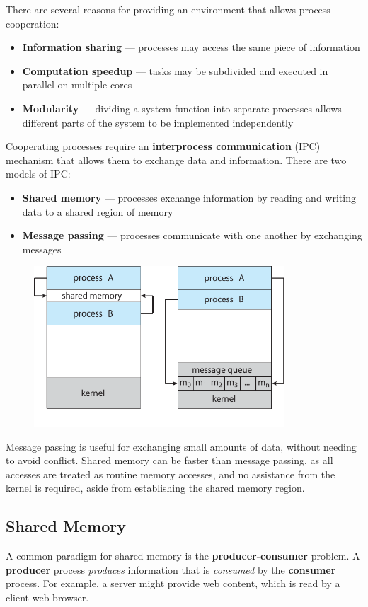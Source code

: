 \documentclass{article}
\begin{document}
There are several reasons for providing an environment that allows
process cooperation:
\begin{itemize}
    \item \textbf{Information sharing} --- processes may access the same
          piece of information
    \item \textbf{Computation speedup} --- tasks may be subdivided and
          executed in parallel on multiple cores
    \item \textbf{Modularity} --- dividing a system function into
          separate processes allows different parts of the system to be
          implemented independently
\end{itemize}
Cooperating processes require an \textbf{interprocess communication}
(IPC) mechanism that allows them to exchange data and information.
There are two models of IPC:
\begin{itemize}
    \item \textbf{Shared memory} --- processes exchange information by
          reading and writing data to a shared region of memory
    \item \textbf{Message passing} --- processes communicate with one
          another by exchanging messages
\end{itemize}
\begin{figure}[H]
    \centering
    \includegraphics[height = 6cm]{figures/ipc_mechanisms.pdf}
\end{figure}
Message passing is useful for exchanging small amounts of data, without
needing to avoid conflict. Shared memory can be faster than message
passing, as all accesses are treated as routine memory accesses, and no
assistance from the kernel is required, aside from establishing the
shared memory region.
\subsection{Shared Memory}
A common paradigm for shared memory is the \textbf{producer-consumer}
problem. A \textbf{producer} process \textit{produces} information that
is \textit{consumed} by the \textbf{consumer} process. For example, a
server might provide web content, which is read by a client web
browser.
\end{document}
